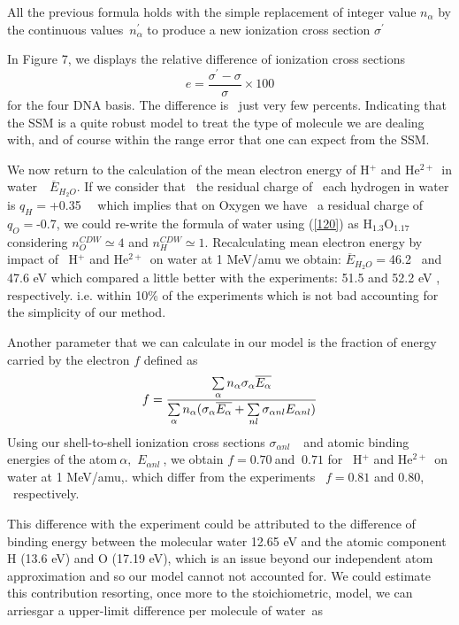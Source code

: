 \documentclass[preprint,12pt]{article}
\begin{document}
All the previous formula holds with the simple replacement of integer value $%
n_{\alpha }$ by the continuous values\ $n_{\alpha }^{\prime }$ to produce a
new ionization cross section $\sigma ^{\prime }$

In Figure 7, we displays the relative difference of ionization cross
sections 
\begin{equation}
e=\frac{\sigma ^{\prime }-\sigma }{\sigma }\times 100  \label{120}
\end{equation}%
for the four DNA basis. The difference is \ just very few percents.
Indicating that the SSM is a quite robust model to treat the type of
molecule we are dealing with, and of course within the range error that one
can expect from the SSM.

We now return to the calculation of the mean electron energy of H$^{+}$ and
He$^{2+~}$ in water\ \ $\overline{E}_{H_{2}O}$. If we consider that \ the
residual charge of \ each hydrogen in water is $q_{H}=$+0.35 \ \cite%
{rappe1991}\ which implies that on Oxygen we have \ a residual charge of $%
q_{O}=$-0.7, we could re-write the formula of water using (\ref{120}) as H$%
_{1.3}$O$_{1.17}$ considering $n_{O}^{CDW}\simeq 4$ and $n_{H}^{CDW}\simeq
1. $ Recalculating mean electron energy by impact of \ H$^{+}$ and He$^{2+~}$
on water at 1 MeV/amu we obtain: $\overline{E}_{H_{2}O}=$46.2 \ and 47.6 eV
which compared a little better with the experiments: 51.5 and 52.2 eV \cite%
{pimblott2007}, respectively. i.e. within 10\% of the experiments which is
not bad accounting for the simplicity of our method.

Another parameter that we can calculate in our model is the fraction of
energy carried by the electron $f$ defined as%
\begin{equation}
f=\frac{\sum\limits_{\alpha }n_{\alpha }\sigma _{\alpha }\overline{%
E_{\alpha }}}{\sum\limits_{\alpha }n_{\alpha }(\sigma _{\alpha }\overline{%
E_{\alpha }}+\sum\limits_{nl}\sigma _{\alpha nl}E_{\alpha nl})}  \label{90}
\end{equation}%
Using our shell-to-shell ionization cross sections $\sigma _{\alpha nl}\ $%
\cite{miraglia2019}\ and atomic binding energies of the atom$\ \alpha ,$ $%
E_{\alpha nl}\ $\cite{clementi}, we obtain $f=$0$.70\ $and $\ 0.71$ for \ H$%
^{+}$ and He$^{2+~}$ on water at 1 MeV/amu,. which differ from the
experiments \ $f=0.81$ and $0.80$, \ respectively.

This difference with the experiment could be attributed to the difference of
binding energy between the molecular water 12.65 eV and the atomic component
H (13.6 eV) and O (17.19 eV), which is an issue beyond our independent atom
approximation and so our model cannot not accounted for. We could estimate
this contribution resorting, once more to the stoichiometric, model, we can
arriesgar a upper-limit difference per molecule of water\ as
\end{document}
